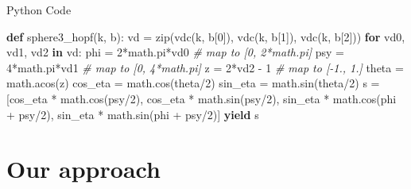 \documentclass[10pt,ignorenonframetext,serif,onlymath]{beamer}
\newenvironment{Shaded}{}{}
\newcommand{\BuiltInTok}[1]{#1}
\newcommand{\CommentTok}[1]{\textcolor[rgb]{0.38,0.63,0.69}{\textit{#1}}}
\newcommand{\ControlFlowTok}[1]{\textcolor[rgb]{0.00,0.44,0.13}{\textbf{#1}}}
\newcommand{\DecValTok}[1]{\textcolor[rgb]{0.25,0.63,0.44}{#1}}
\newcommand{\KeywordTok}[1]{\textcolor[rgb]{0.00,0.44,0.13}{\textbf{#1}}}
\newcommand{\NormalTok}[1]{#1}
\newcommand{\OperatorTok}[1]{\textcolor[rgb]{0.40,0.40,0.40}{#1}}
\begin{document}
\begin{frame}[fragile]{Python Code}
\protect\hypertarget{python-code-1}{}

\begin{Shaded}
\begin{Highlighting}[]
\KeywordTok{def}\NormalTok{ sphere3_hopf(k, b):}
\NormalTok{    vd }\OperatorTok{=} \BuiltInTok{zip}\NormalTok{(vdc(k, b[}\DecValTok{0}\NormalTok{]), vdc(k, b[}\DecValTok{1}\NormalTok{]), vdc(k, b[}\DecValTok{2}\NormalTok{]))}
    \ControlFlowTok{for}\NormalTok{ vd0, vd1, vd2 }\KeywordTok{in}\NormalTok{ vd:}
\NormalTok{        phi }\OperatorTok{=} \DecValTok{2}\OperatorTok{*}\NormalTok{math.pi}\OperatorTok{*}\NormalTok{vd0   }\CommentTok{# map to [0, 2*math.pi]}
\NormalTok{        psy }\OperatorTok{=} \DecValTok{4}\OperatorTok{*}\NormalTok{math.pi}\OperatorTok{*}\NormalTok{vd1   }\CommentTok{# map to [0, 4*math.pi]}
\NormalTok{        z }\OperatorTok{=} \DecValTok{2}\OperatorTok{*}\NormalTok{vd2 }\OperatorTok{-} \DecValTok{1}         \CommentTok{# map to [-1., 1.]}
\NormalTok{        theta }\OperatorTok{=}\NormalTok{ math.acos(z)}
\NormalTok{        cos_eta }\OperatorTok{=}\NormalTok{ math.cos(theta}\OperatorTok{/}\DecValTok{2}\NormalTok{)}
\NormalTok{        sin_eta }\OperatorTok{=}\NormalTok{ math.sin(theta}\OperatorTok{/}\DecValTok{2}\NormalTok{)}
\NormalTok{        s }\OperatorTok{=}\NormalTok{ [cos_eta }\OperatorTok{*}\NormalTok{ math.cos(psy}\OperatorTok{/}\DecValTok{2}\NormalTok{),}
\NormalTok{             cos_eta }\OperatorTok{*}\NormalTok{ math.sin(psy}\OperatorTok{/}\DecValTok{2}\NormalTok{),}
\NormalTok{             sin_eta }\OperatorTok{*}\NormalTok{ math.cos(phi }\OperatorTok{+}\NormalTok{ psy}\OperatorTok{/}\DecValTok{2}\NormalTok{),}
\NormalTok{             sin_eta }\OperatorTok{*}\NormalTok{ math.sin(phi }\OperatorTok{+}\NormalTok{ psy}\OperatorTok{/}\DecValTok{2}\NormalTok{)]}
        \ControlFlowTok{yield}\NormalTok{ s}
\end{Highlighting}
\end{Shaded}

\end{frame}

\hypertarget{our-approach}{%
\section{Our approach}\label{our-approach}}
\end{document}

